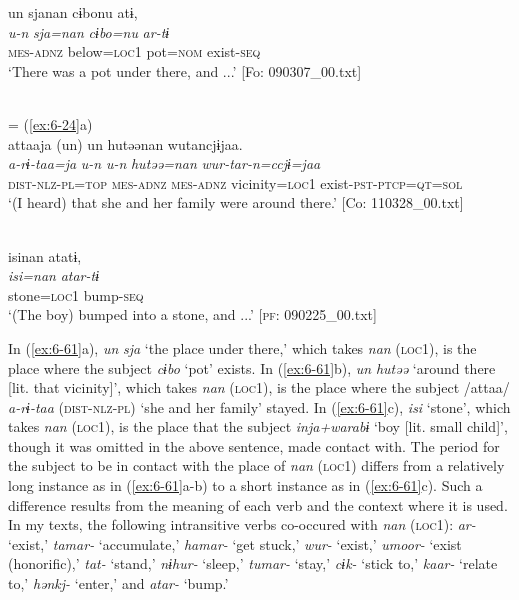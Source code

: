 \ea\label{ex:6-61}
\ea {\TM}  un  sjanan  cɨbonu  atɨ,\\
\glll \textit{u-n}  \textit{sja=nan}  \textit{cɨbo=nu}  \textit{ar-tɨ}\\
\textsc{mes}-\textsc{adnz}  below=\textsc{loc1}  pot=\textsc{nom}  exist-\textsc{seq}\\
\glt ‘There was a pot under there, and ...’ [Fo: 090307\_00.txt]
\z

\ex{}\\
= (\ref{ex:6-24}a)\\

{\TM}
\glll attaaja  (un)  un  hutəənan   wutancjɨjaa.\\
      \textit{a-rɨ-taa=ja}  \textit{u-n}  \textit{u-n}  \textit{hutəə=nan} \textit{wur-tar-n=ccjɨ=jaa}\\
      \textsc{dist}-\textsc{nlz}-\textsc{pl}=\textsc{top}  \textsc{mes}-\textsc{adnz}  \textsc{mes}-\textsc{adnz}  vicinity=\textsc{loc1}      exist-\textsc{pst}-\textsc{ptcp}=\textsc{qt}=\textsc{sol}\\
\glt ‘(I heard) that she and her family were around there.’ [Co: 110328\_00.txt]
\z

\ex{}\\
{\TM}
\glll  isinan  atatɨ,\\
\textit{isi=nan}  \textit{atar-tɨ}\\
stone=\textsc{loc1}  bump-\textsc{seq}\\
\glt ‘(The boy) bumped into a stone, and ...’ [\textsc{pf}: 090225\_00.txt]
\z

In (\ref{ex:6-61}a), \textit{un} \textit{sja} ‘the place under there,’ which takes \textit{nan} (\textsc{loc1}), is the place where the subject \textit{cɨbo} ‘pot’ exists. In (\ref{ex:6-61}b), \textit{un} \textit{hutəə} ‘around there [lit. that vicinity]’, which takes \textit{nan} (\textsc{loc1}), is the place where the subject /attaa/ \textit{a-rɨ-taa} (\textsc{dist}-\textsc{nlz}-\textsc{pl}) ‘she and her family’ stayed. In (\ref{ex:6-61}c), \textit{isi} ‘stone’, which takes \textit{nan} (\textsc{loc1}), is the place that the subject \textit{inja+warabɨ} ‘boy [lit. small child]’, though it was omitted in the above sentence, made contact with. The period for the subject to be in contact with the place of \textit{nan} (\textsc{loc1}) differs from a relatively long instance as in (\ref{ex:6-61}a-b) to a short instance as in (\ref{ex:6-61}c). Such a difference results from the meaning of each verb and the context where it is used. In my texts, the following intransitive verbs co-occured with \textit{nan} (\textsc{loc1}): \textit{ar-} ‘exist,’ \textit{tamar-} ‘accumulate,’ \textit{hamar-} ‘get stuck,’ \textit{wur-} ‘exist,’ \textit{umoor-} ‘exist (honorific),’ \textit{tat-} ‘stand,’ \textit{nɨhur-} ‘sleep,’ \textit{tumar-} ‘stay,’ \textit{cɨk-} ‘stick to,’ \textit{kaar-} ‘relate to,’ \textit{hənkj-} ‘enter,’ and \textit{atar-} ‘bump.’

